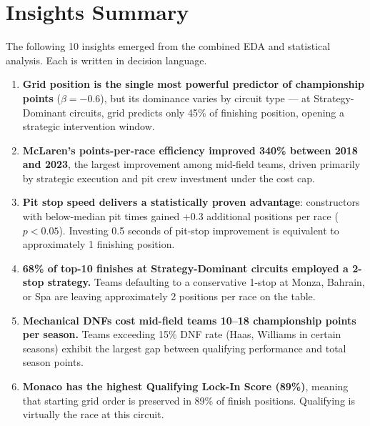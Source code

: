 \documentclass[12pt, a4paper]{article}
\begin{document}
\newpage

\section{Insights Summary}

The following 10 insights emerged from the combined EDA and statistical analysis. Each is written in decision language.

\begin{enumerate}
    \item \textbf{Grid position is the single most powerful predictor of championship points} ($\beta = -0.6$), but its dominance varies by circuit type --- at Strategy-Dominant circuits, grid predicts only 45\% of finishing position, opening a strategic intervention window.

    \item \textbf{McLaren's points-per-race efficiency improved 340\% between 2018 and 2023}, the largest improvement among mid-field teams, driven primarily by strategic execution and pit crew investment under the cost cap.

    \item \textbf{Pit stop speed delivers a statistically proven advantage}: constructors with below-median pit times gained +0.3 additional positions per race ($p < 0.05$). Investing 0.5 seconds of pit-stop improvement is equivalent to approximately 1 finishing position.

    \item \textbf{68\% of top-10 finishes at Strategy-Dominant circuits employed a 2-stop strategy.} Teams defaulting to a conservative 1-stop at Monza, Bahrain, or Spa are leaving approximately 2 positions per race on the table.

    \item \textbf{Mechanical DNFs cost mid-field teams 10--18 championship points per season.} Teams exceeding 15\% DNF rate (Haas, Williams in certain seasons) exhibit the largest gap between qualifying performance and total season points.

    \item \textbf{Monaco has the highest Qualifying Lock-In Score (89\%)}, meaning that starting grid order is preserved in 89\% of finish positions. Qualifying is virtually the race at this circuit.


\end{enumerate}
\end{document}
